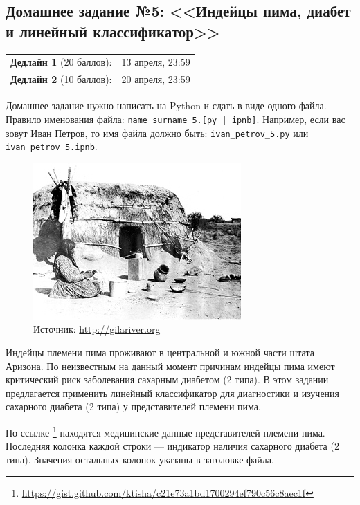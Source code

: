 \documentclass[a4paper,12pt]{article}
\begin{document}
\subsection*{Домашнее задание №5: <<Индейцы пима, диабет и линейный классификатор>>}

\begin{tabular}{@{}lr}
  \textbf{Дедлайн 1} (20 баллов): & 13 апреля, 23:59 \\
  \textbf{Дедлайн 2} (10 баллов): & 20 апреля, 23:59 \\
\end{tabular}

Домашнее задание нужно написать на Python и сдать в виде одного файла.
Правило именования файла: \texttt{name\_surname\_5.[py | ipnb]}. Например, если
вас зовут Иван Петров, то имя файла должно быть: \texttt{ivan\_petrov\_5.py} или \texttt{ivan\_petrov\_5.ipnb}.

\makebox[\linewidth]{\hrulefill}

\begin{figure}[h!]
  \centering
  \includegraphics[width=.4\linewidth]{images/pima}
  \caption{Источник: \url{http://gilariver.org}}
\end{figure}

Индейцы племени пима проживают в центральной и южной части штата Аризона. По
неизвестным на данный момент причинам индейцы пима имеют критический риск
заболевания сахарным диабетом (2 типа). В этом задании предлагается применить
линейный классификатор для диагностики и изучения сахарного диабета (2 типа) у
представителей племени пима.

По ссылке%
\footnote{\url{https://gist.github.com/ktisha/c21e73a1bd1700294ef790c56c8aec1f}}
находятся медицинские данные представителей племени пима. Последняя колонка
каждой строки --- индикатор наличия сахарного диабета (2 типа). Значения
остальных колонок указаны в заголовке файла.

\pagebreak
\end{document}
